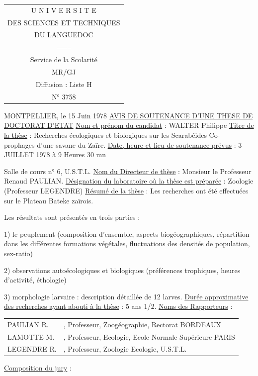 \begin{tabular}{c}
U N I V E R S I T E\\
DES SCIENCES ET TECHNIQUES\\
DU LANGUEDOC\\
\texttt{------------}\\
Service de la Scolarité\\
MR/GJ\\
Diffusion : Liste H\\
N° 3758
\end{tabular}

MONTPELLIER, le 15 Juin 1978
\uline{AVIS DE SOUTENANCE D'UNE THESE DE DOCTORAT D'ETAT}
\uline{Nom et prénom du candidat} : WALTER Philippe
\uline{Titre de la thèse} : Recherches écologiques et biologiques sur les Scarabéides Co-\\
prophages d'une savane du Zaïre.
\uline{Date, heure et lieu de soutenance prévus} : 3 JUILLET 1978 à 9 Heures 30 mn

Salle de cours n° 6, U.S.T.L.
\uline{Nom du Directeur de thèse} : Monsieur le Professeur Renaud PAULIAN.
\uline{Désignation du laboratoire où la thèse est préparée} : Zoologie (Professeur LEGENDRE)
\uline{Résumé de la thèse} : Les recherches ont été effectuées sur le Plateau Bateke zaïrois.

Les résultats sont présentés en trois parties :

1) le peuplement (composition d'ensemble, aspects biogéographiques, répartition dans les différentes formations végétales, fluctuations des densités de population, sex-ratio)

2) observations autoécologiques et biologiques (préférences trophiques, heures d'activité, éthologie)

3) morphologie larvaire : description détaillée de 12 larves.
\uline{Durée approximative des recherches ayant abouti à la thèse} : 5 ans 1/2.
\uline{Noms des Rapporteurs} :

\begin{tabular}{ll}
PAULIAN R. & , Professeur, Zoogéographie, Rectorat BORDEAUX\\
LAMOTTE M. & , Professeur, Ecologie, Ecole Normale Supérieure PARIS\\
LEGENDRE R. & , Professeur, Zoologie Ecologie, U.S.T.L.
\end{tabular}
\uline{Composition du jury} :

